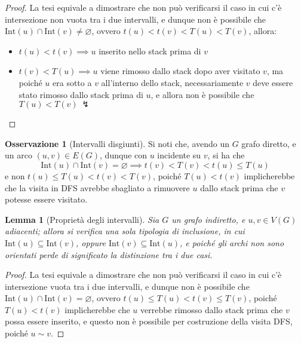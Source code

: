 \documentclass[14pt]{extreport}
\newtheorem{lemma}{Lemma}[subsection]
\theoremstyle{definition}
\theoremstyle{definition}
\newtheorem{remark}{Osservazione}[subsection]
\begin{document}
\begin{proof}
    La tesi equivale a dimostrare che non può verificarsi il caso in cui c'è intersezione non vuota tra i due intervalli, e dunque non è possibile che $\mathrm{Int}(u) \cap \mathrm{Int}(v) \neq \varnothing$, ovvero $t(u) < t(v) < T(u) < T(v)$, allora:

    \begin{itemize}
        \item $t(u) < t(v) \implies u$ inserito nello stack prima di $v$
        \item $t(v) < T(u) \implies u$ viene rimosso dallo stack dopo aver visitato $v$, ma poiché $u$ era sotto a $v$ all'interno dello stack, necessariamente $v$ deve essere stato rimosso dallo stack prima di $u$, e allora non è possibile che $T(u) < T(v) \ \lightning$
    \end{itemize}
\end{proof}

\begin{remark}[Intervalli disgiunti]
    Si noti che, avendo un $G$ grafo diretto, e un arco $(u, v) \in E(G)$, dunque con $u$ incidente su $v$, si ha che $$\mathrm{Int}(u) \cap \mathrm{Int}(v) = \varnothing \implies t(v) < T(v) < t(u) \le T(u)$$ e non $t(u) \le T(u) < t(v) < T(v)$, poiché $T(u) < t(v)$ implicherebbe che la visita in DFS avrebbe sbagliato a rimuovere $u$ dallo stack prima che $v$ potesse essere visitato.
\end{remark}

\begin{lemma}[Proprietà degli intervalli]
    Sia $G$ un grafo indiretto, e $u, v \in V(G)$ adiacenti; allora si verifica una sola tipologia di inclusione, in cui $\mathrm{Int}(u) \subseteq \mathrm{Int}(v)$, oppure $\mathrm{Int}(v) \subseteq \mathrm{Int}(u)$, e poiché gli archi non sono orientati perde di significato la distinzione tra i due casi.
\end{lemma}

\begin{proof}
    La tesi equivale a dimostrare che non può verificarsi il caso in cui c'è intersezione vuota tra i due intervalli, e dunque non è possibile che $\mathrm{Int}(u) \cap \mathrm{Int}(v) = \varnothing$, ovvero $t(u) \le T(u) < t(v) \le T(v)$, poiché $T(u) < t(v)$ implicherebbe che $u$ verrebbe rimosso dallo stack prima che $v$ possa essere inserito, e questo non è possibile per costruzione della visita DFS, poiché $u \sim v$.
\end{proof}
\end{document}
